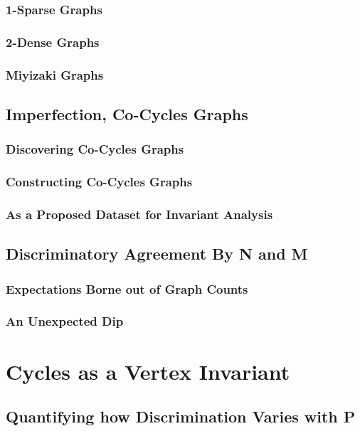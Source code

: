 \documentclass[11pt,a4paper]{report}
\begin{document}
\subsection{1-Sparse Graphs}

\subsection{2-Dense Graphs}

\subsection{Miyizaki Graphs}


\section{Imperfection, Co-Cycles Graphs}
\subsection{Discovering Co-Cycles Graphs}
\subsection{Constructing Co-Cycles Graphs}
\subsection{As a Proposed Dataset for Invariant Analysis}

\section{Discriminatory Agreement By N and M}
\subsection{Expectations Borne out of Graph Counts}
\subsection{An Unexpected Dip}



\chapter{Cycles as a Vertex Invariant}

\section{Quantifying how Discrimination Varies with P}
\end{document}
